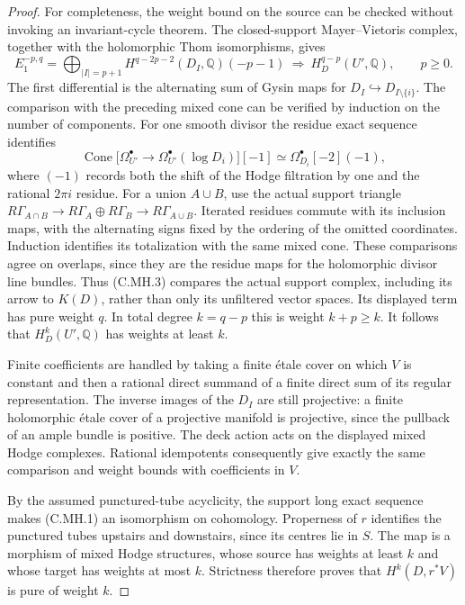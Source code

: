 \begin{proof}
For completeness, the weight bound on the source can
be checked without invoking an invariant-cycle theorem.
The closed-support Mayer--Vietoris complex, together
with the holomorphic Thom isomorphisms, gives
\[
 E_1^{-p,q}=
 \bigoplus_{|I|=p+1}
 H^{q-2p-2}(D_I,\mathbb Q)(-p-1)
 \ \Longrightarrow\ H_D^{q-p}(U',\mathbb Q),
 \qquad p\ge0.
 \tag{C.MH.3}
\]
The first differential is the alternating sum of Gysin
maps for $D_I\hookrightarrow D_{I\setminus\{i\}}$.
The comparison with the preceding mixed cone can be
verified by induction on the number of components.
For one smooth divisor the residue exact sequence
identifies
\[
 \operatorname{Cone}\bigl[\Omega_{U'}^\bullet
       \longrightarrow\Omega_{U'}^\bullet(\log D_i)\bigr][-1]
       \simeq\Omega_{D_i}^\bullet[-2](-1),
\]
where $(-1)$ records both the shift of the Hodge
filtration by one and the rational $2\pi i$ residue.
For a union $A\cup B$, use the actual support triangle
$R\Gamma_{A\cap B}\to R\Gamma_A\oplus R\Gamma_B
\to R\Gamma_{A\cup B}$. Iterated residues commute
with its inclusion maps, with the alternating signs
fixed by the ordering of the omitted coordinates.
Induction identifies its totalization with the same
mixed cone. These comparisons agree on overlaps,
since they are the residue maps for the holomorphic
divisor line bundles. Thus (C.MH.3) compares the actual support
complex, including its arrow to $K(D)$, rather than
only its unfiltered vector spaces. Its displayed term
has pure weight $q$. In total degree $k=q-p$ this is
weight $k+p\ge k$. It follows that $H_D^k(U',\mathbb Q)$
has weights at least $k$.

Finite coefficients are handled by taking a finite
\'{e}tale cover on which $V$ is constant and then a
rational direct summand of a finite direct sum of its
regular representation.
The inverse images of the $D_I$ are still projective:
a finite holomorphic \'{e}tale cover of a
projective manifold is projective, since the pullback
of an ample bundle is positive. The deck action acts
on the displayed mixed Hodge complexes. Rational
idempotents consequently give exactly the same
comparison and weight bounds with coefficients in $V$.

By the assumed punctured-tube acyclicity, the support
long exact sequence makes (C.MH.1) an isomorphism on
cohomology. Properness of $r$ identifies the punctured
tubes upstairs and downstairs, since its centres lie
in $S$. The map is a morphism of mixed Hodge structures,
whose source has weights at least $k$ and whose target
has weights at most $k$. Strictness therefore proves
that $H^k(D,r^*V)$ is pure of weight $k$.


\end{proof}

